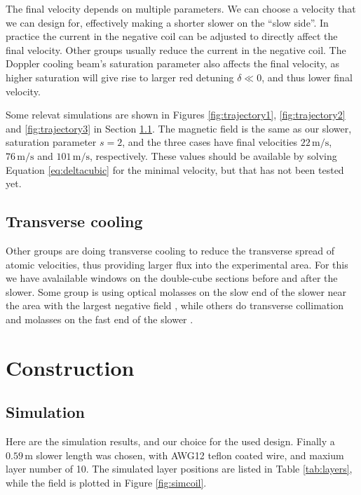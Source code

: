 \documentclass[12pt,a4paper]{article}
\newcommand{\unit}[1]{\ensuremath{\, \mathrm{#1}}}
\begin{document}
The final velocity depends on multiple parameters. We can choose a velocity that we can design for, effectively making a shorter slower on the ``slow side''. In practice the current in the negative coil can be adjusted to directly affect the final velocity. Other groups usually reduce the current in the negative coil. The Doppler cooling beam's saturation parameter also affects the final velocity, as higher saturation will give rise to larger red detuning $\delta \ll 0$, and thus lower final velocity.

Some relevat simulations are shown in Figures \ref{fig:trajectory1}, \ref{fig:trajectory2} and \ref{fig:trajectory3} in Section \ref{seq:sim}. The magnetic field is the same as our slower, saturation parameter $s=2$, and the three cases have final velocities $22\unit{m/s}$, $76\unit{m/s}$ and $101\unit{m/s}$, respectively. These values should be available by solving Equation \ref{eq:deltacubic} for the minimal velocity, but that has not been tested yet.

\subsection{Transverse cooling}

Other groups are doing transverse cooling to reduce the transverse spread of atomic velocities, thus providing larger flux into the experimental area. For this we have avalailable windows on the double-cube sections before and after the slower. Some group is using optical molasses on the slow end of the slower  near the area with the largest negative field \cite{Joffe1993}, while others do transverse collimation and molasses on the fast end of the slower \cite{Slowe2005}.


\section{Construction}

\subsection{Simulation}
\label{seq:sim}

Here are the simulation results, and our choice for the used design. 
Finally a $0.59\unit{m}$ slower length was chosen, with AWG12 teflon coated wire, and maxium layer number of 10. The simulated layer positions are listed in Table \ref{tab:layers}, while the field is plotted in Figure \ref{fig:simcoil}.
\end{document}
